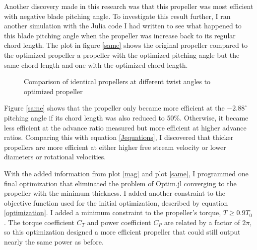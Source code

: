 \documentclass[journal ]{new-aiaa}
\begin{document}
Another discovery made in this research was that this propeller was most efficient with negative blade pitching angle. To investigate this result further, I ran another simulation with the Julia code I had written to see what happened to this blade pitching angle when the propeller was increase back to its regular chord length. The plot in figure \eqref{same} shows the original propeller compared to the optimized propeller a propeller with the optimized pitching angle but the same chord length and one with the optimized chord length. 

\begin{figure}[H]
\centering
	
	\caption{Comparison of identical propellers at different twist angles to optimized propeller}
	\captionsetup{aboveskip=0pt,font=it}
	\label{same}
\end{figure}

Figure \eqref{same} shows that the propeller only became more efficient at the $-2.88^{\circ}$ pitching angle if its chord length was also reduced to 50\%. Otherwise, it became less efficient at the advance ratio measured but more efficient at higher advance ratios. Comparing this with equation \eqref{Jequations}, I discovered that thicker propellers are more efficient at either higher free stream velocity or lower diameters or rotational velocities.

With the added information from plot \eqref{mag} and plot \eqref{same}, I programmed one final optimization that eliminated the problem of Optim.jl converging to the propeller with the minimum thickness. I added another constraint to the objective function used for the initial optimization, described by equation \eqref{optimization}. I added a minimum constraint to the propeller's torque, $T \geq 0.9 T_{0}$. The torque coefficient $C_{T}$ and power coefficient $C_{P}$ are related by a factor of $2 \pi$, so this optimization designed a more efficient propeller that could still output nearly the same power as before.
\end{document}

